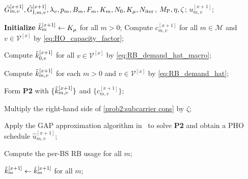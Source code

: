 \documentclass[10pt,journal,letterpaper]{journal_template/IEEEtran}
\newcommand{\rev}[1]{\textcolor{revisioncolor}{{}#1}}
\newif\ifshowdeletions
\newcommand{\currentdel}[1]{\ifshowdeletions\textcolor{deletioncolor}{\sout{#1}}\fi}
\theoremstyle{remark}
\begin{document}
\begin{algorithm}[htbp]
    \caption{Generalized Assignment-based Proactive Handover (GAP-HO)}
    \label{alg:GAP-HO}
    \renewcommand{\algorithmicrequire}{\textbf{Input:}}
    \renewcommand{\algorithmicensure}{\textbf{Output:}}
    \begin{algorithmic}[1]
        \REQUIRE
        $\Tilde{G}_{m,v}^{[x+1]}, \Tilde{G}_{{\rm I},m,v}^{[x+1]}, \lambda_v, p_m, B_m, F_m, K_m, N_0, K_\mu, N_{\rm iter}$, $M_{\rm P}, \eta, \zeta$\currentdel{$, \epsilon$};
        \ENSURE
        $u_{m,v}^{[x+1]}$;

        \STATE \textbf{Initialize} $\Tilde{k}_{m}^{[x+1]} \gets K_\mu$ for all $m>0$;
        \STATE \rev{Compute $c_{m,v}^{[x+1]}$ for all $m \in \mathcal{M}$ and $v \in \mathcal{V}^{[x]}$ by \eqref{eq:HO_capacity_factor};}

        \STATE Compute $\Tilde{k}_{0,v}^{[x+1]}$ for all $v \in \mathcal{V}^{[x]}$
        by \eqref{eq:RB_demand_hat_macro};

            \STATE Compute $\Tilde{k}_{m,v}^{[x+1]}$ for each $m>0$ and $v \in \mathcal{V}^{[x]}$ by \eqref{eq:RB_demand_hat};

            \STATE Form \textbf{P2} with $\{\Tilde{k}_{m,v}^{[x+1]}\}$\rev{ and $\{c_{m,v}^{[x+1]}\}$};
            
                \STATE Multiply the right-hand side of \eqref{prob2:subcarrier cons} by $\zeta$;
            \ENDWHILE

            \STATE Apply the GAP approximation algorithm in~\cite{shmoys1993approximation}
                   to solve \textbf{P2} and obtain a PHO schedule
                   $\hat{u}_{m,v}^{[x+1]}$;

            \STATE Compute the \currentdel{implied} per-BS RB usage
            \currentdel{$\hat{k}_{m}^{[x+1]} = \sum_{v \in \mathcal{V}^{[x]}}\Tilde{k}_{m,v}^{[x+1]} \hat{u}_{m,v}^{[x+1]}$} for all $m$;

            \ifshowdeletions
                \STATE \currentdel{\textbf{if} $\max_m \bigl|\hat{k}_{m}^{[x+1]} - \Tilde{k}_{m}^{[x+1]}\bigr| \leq \epsilon$ \textbf{then}}
                \STATE \currentdel{$\Tilde{k}_{m}^{[x+1]} \gets \hat{k}_{m}^{[x+1]}$ for all $m$;}
                \STATE \currentdel{\textbf{break};}
                \STATE \currentdel{\textbf{else}}
                \STATE \currentdel{$\Tilde{k}_{m}^{[x+1]} \gets \hat{k}_{m}^{[x+1]}$ for all $m$;}
                \STATE \currentdel{\textbf{end if}}
            \fi
            \STATE \rev{$\Tilde{k}_{m}^{[x+1]} \gets \hat{k}_{m}^{[x+1]}$ for all $m$;}
        \ENDFOR


\end{algorithmic}
\end{algorithm}
\end{document}
